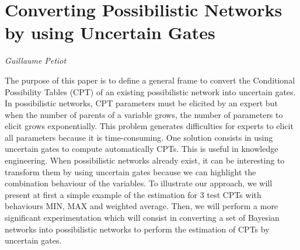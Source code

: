 \documentclass[../booklet.tex]{subfiles}
\begin{document}
\section[Converting Possibilistic Networks by using Uncertain Gates. {\it Guillaume Petiot}]{Converting Possibilistic Networks by using Uncertain Gates}

\begin{center}
  {\it Guillaume Petiot}
\end{center}

\vskip 0.8cm


The purpose of this paper is to define a general frame to convert the Conditional Possibility Tables (CPT) of an existing possibilistic network into uncertain gates. In possibilistic networks, CPT parameters must be elicited by an expert but when the number of parents of a variable grows, the number of parameters to elicit grows exponentially.	This problem generates difficulties for experts to elicit all parameters because it is time-consuming. One solution consists in using uncertain gates to compute automatically CPTs. This is useful in knowledge engineering. When possibilistic networks already exist, it can be interesting to transform them by using uncertain gates because we can highlight the  combination behaviour of the variables. To illustrate our approach, we will present at first a simple example of the estimation for 3 test CPTs with behaviours MIN, MAX and weighted average. Then, we will perform a more significant experimentation which will consist in converting a set of Bayesian networks into possibilistic networks to perform the estimation of CPTs by uncertain gates. 

\end{document}
